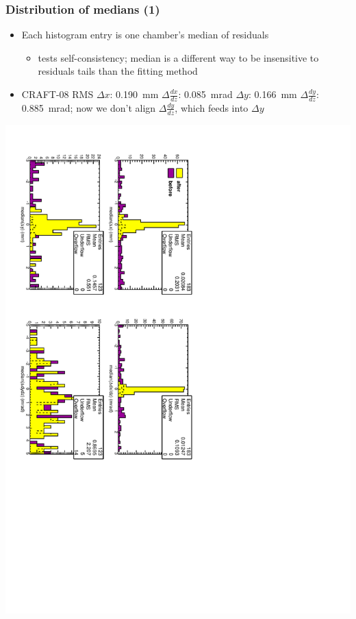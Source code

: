 \documentclass[compress]{beamer}
\begin{document}
\begin{frame}
\frametitle{Distribution of medians (1)}
\begin{itemize}
\item Each histogram entry is one chamber's median of residuals
\begin{itemize}
\item tests self-consistency; median is a different way to be insensitive to residuals tails than the fitting method
\end{itemize}
\item CRAFT-08 RMS $\Delta x$: 0.190~mm $\Delta \frac{dx}{dz}$: 0.085~mrad $\Delta y$: 0.166~mm $\Delta \frac{dy}{dz}$: 0.885~mrad; now we don't align $\Delta \frac{dy}{dz}$, which feeds into $\Delta y$
\end{itemize}

\includegraphics[height=\linewidth, angle=90]{NOV4DT_median_all.pdf}
\end{frame}
\end{document}
